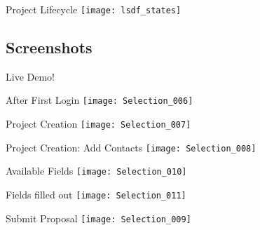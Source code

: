 \begin{frame}[c]{Project Lifecycle}
    \texttt{[image: lsdf\_states]}
\end{frame}

\subsection{Screenshots}


\addtocounter{framenumber}{1}
\begin{frame}[standout]
    \Huge
    Live Demo!
\end{frame}


\begin{frame}[c]{After First Login}
    \texttt{[image: Selection\_006]}
\end{frame}

\begin{frame}[c]{Project Creation}
    \texttt{[image: Selection\_007]}
\end{frame}

\begin{frame}[c]{Project Creation: Add Contacts}
    \texttt{[image: Selection\_008]}
\end{frame}

\begin{frame}[c]{Available Fields}
    \texttt{[image: Selection\_010]}
\end{frame}

\begin{frame}[c]{Fields filled out}
    \texttt{[image: Selection\_011]}
\end{frame}

\begin{frame}[c]{Submit Proposal}
    \texttt{[image: Selection\_009]}
\end{frame}

